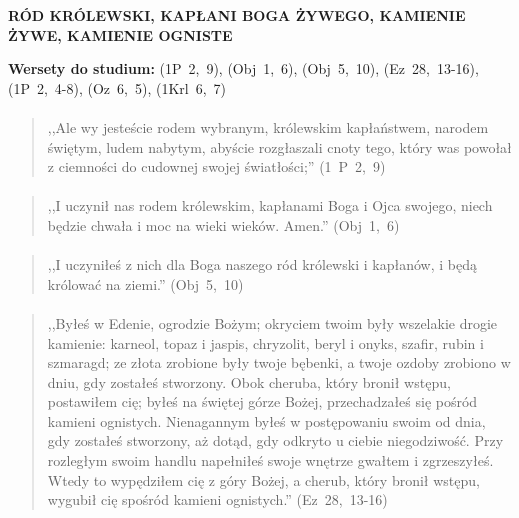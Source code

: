 \documentclass[10pt,a4paper,oneside]{article}
\begin{document}
\centerline{\textbf{\MakeUppercase{Ród Królewski, Kapłani Boga Żywego, Kamienie Żywe, Kamienie Ogniste}}}
\begin{center}
\textbf{Wersety do studium:} 
\mbox{(1P 2, 9)}, \mbox{(Obj 1, 6)}, \mbox{(Obj 5, 10)}, \mbox{(Ez 28, 13-16)}, \mbox{(1P 2, 4-8)}, \mbox{(Oz 6, 5)}, \mbox{(1Krl 6, 7)}
\end{center}
\paragraph{}
\begin{quote}
,,Ale wy jesteście rodem wybranym, królewskim kapłaństwem, narodem świętym, ludem nabytym, abyście rozgłaszali cnoty tego, który was powołał z ciemności do cudownej swojej światłości;'' \mbox{(1 P 2, 9)}
\end{quote}
\paragraph{}
\begin{quote}
,,I uczynił nas rodem królewskim, kapłanami Boga i Ojca swojego, niech będzie chwała i moc na wieki wieków. Amen.'' \mbox{(Obj 1, 6)}
\end{quote}
\paragraph{}
\begin{quote}
,,I uczyniłeś z nich dla Boga naszego ród królewski i kapłanów, i będą królować na ziemi.'' \mbox{(Obj 5, 10)}
\end{quote}
\paragraph{}
\begin{quote}
,,Byłeś w Edenie, ogrodzie Bożym; okryciem twoim były wszelakie drogie kamienie: karneol, topaz i jaspis, chryzolit, beryl i onyks, szafir, rubin i szmaragd; ze złota zrobione były twoje bębenki, a twoje ozdoby zrobiono w dniu, gdy zostałeś stworzony. Obok cheruba, który bronił wstępu, postawiłem cię; byłeś na świętej górze Bożej, przechadzałeś się pośród kamieni ognistych. Nienagannym byłeś w postępowaniu swoim od dnia, gdy zostałeś stworzony, aż dotąd, gdy odkryto u ciebie niegodziwość. Przy rozległym swoim handlu napełniłeś swoje wnętrze gwałtem i zgrzeszyłeś. Wtedy to wypędziłem cię z góry Bożej, a cherub, który bronił wstępu, wygubił cię spośród kamieni ognistych.'' \mbox{(Ez 28, 13-16)}
\end{quote}
\end{document}
